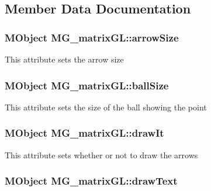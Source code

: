 \subsection{Member Data Documentation}
\hypertarget{class_m_g__matrix_g_l_aac3b7859f05b724dd4183bc429053c70}{
\subsubsection[{arrow\-Size}]{\setlength{\rightskip}{0pt plus 5cm}M\-Object M\-G\-\_\-matrix\-G\-L\-::arrow\-Size\hspace{0.3cm}{\ttfamily [static]}}}\label{class_m_g__matrix_g_l_aac3b7859f05b724dd4183bc429053c70}
This attribute sets the arrow size \hypertarget{class_m_g__matrix_g_l_ab52c9ead5ed04f77cecf150494a4da79}{
\subsubsection[{ball\-Size}]{\setlength{\rightskip}{0pt plus 5cm}M\-Object M\-G\-\_\-matrix\-G\-L\-::ball\-Size\hspace{0.3cm}{\ttfamily [static]}}}\label{class_m_g__matrix_g_l_ab52c9ead5ed04f77cecf150494a4da79}
This attribute sets the size of the ball showing the point \hypertarget{class_m_g__matrix_g_l_a632284a9caf3b739eb410610b884bd6f}{
\subsubsection[{draw\-It}]{\setlength{\rightskip}{0pt plus 5cm}M\-Object M\-G\-\_\-matrix\-G\-L\-::draw\-It\hspace{0.3cm}{\ttfamily [static]}}}\label{class_m_g__matrix_g_l_a632284a9caf3b739eb410610b884bd6f}
This attribute sets whether or not to draw the arrows \hypertarget{class_m_g__matrix_g_l_a2fba3030eb5babc2f98467d75177bf09}{
\subsubsection[{draw\-Text}]{\setlength{\rightskip}{0pt plus 5cm}M\-Object M\-G\-\_\-matrix\-G\-L\-::draw\-Text\hspace{0.3cm}{\ttfamily [static]}}}\label{class_m_g__matrix_g_l_a2fba3030eb5babc2f98467d75177bf09}
